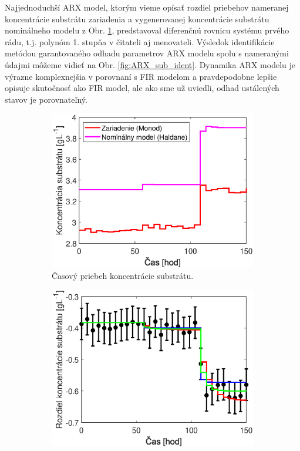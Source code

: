 Najjednoduchší ARX model, ktorým vieme opísať rozdiel priebehov nameranej koncentrácie substrátu zariadenia a vygenerovanej koncentrácie substrátu nominálneho modelu z Obr. \ref{fig:ARX_sub_data}, predstavoval diferenčnú rovnicu systému prvého rádu, t.j. polynóm 1. stupňa v čitateli aj menovateli. Výsledok identifikácie metódou garantovaného odhadu parametrov ARX modelu spolu s nameranými údajmi môžeme vidieť na Obr. \ref{fig:ARX_sub_ident}. Dynamika ARX modelu je výrazne komplexnejšia v porovnaní s FIR modelom a pravdepodobne lepšie opisuje skutočnosť ako FIR model, ale ako sme už uviedli, odhad ustálených stavov je porovnateľný.  
\begin{figure}
\centering
	\begin{subfigure}[b]{0.49\textwidth}
		\centering
		\includegraphics[width=\linewidth]{images/ARX_sub_data}
		\caption{Časový priebeh koncentrácie substrátu.\newline}
		\label{fig:ARX_sub_data}
	\end{subfigure}
	\begin{subfigure}[b]{0.49\textwidth}
		\centering
		\includegraphics[width=\linewidth]{images/ARX_sub_ident}

\end{subfigure}
\end{figure}
